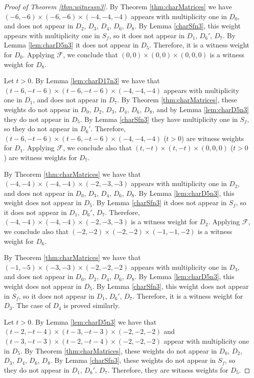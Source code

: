 \documentclass[11pt,reqno]{amsart}
\newcommand{\mc}[1]{\mathcal{#1}}
\numberwithin{equation}{section}
\begin{document}
\begin{proof}[Proof of Theorem \ref{thm:witnessn3}]
By Theorem \ref{thm:charMatrices} we have  $(-6,-6)\times (-6,-6)\times (-4,-4,-4)$ appears with multiplicity one in $D_0$, and does not appear in $D_2$, $D_3$, $D_4$, $D_6$, $D_8$. By Lemma \ref{charSfn3}, this weight appears with multiplicity one in $S_f$, so it does not appear in $D_1$, $D_6'$, $D_7$. By Lemma \ref{lem:charD5n3} it does not appear in $D_5$. Therefore, it is a witness weight for $D_0$. Applying $\mc{F}$, we conclude that $(0,0)\times (0,0)\times (0,0,0)$ is a witness weight for $D_8$.

Let $t>0$. By Lemma \ref{lem:charD17n3} we have that $(t-6,-t-6)\times (t-6,-t-6)\times (-4,-4,-4)$ appears with multiplicity one in $D_1$, and does not appear in $D_7$. By Theorem \ref{thm:charMatrices}, these weights do not appear in $D_0$, $D_2$, $D_3$, $D_4$, $D_6$, $D_8$, and by Lemma \ref{lem:charD5n3} they do not appear in $D_5$. By Lemma \ref{charSfn3} they have multiplicity one in $S_f$, so they do not appear in $D_6'$. Therefore, $(t-6,-t-6)\times (t-6,-t-6)\times (-4,-4,-4)$ ($t>0$) are witness weights for $D_1$. Applying $\mc{F}$, we conclude also that $(t,-t)\times (t,-t)\times (0,0,0)$ ($t>0$) are witness weights for $D_7$. 

By Theorem \ref{thm:charMatrices} we have that $(-4,-4)\times (-4,-4)\times (-2,-3,-3)$ appears with multiplicity one in $D_2$, and does not appear in $D_0$, $D_3$, $D_4$, $D_6$, $D_8$. By Lemma \ref{lem:charD5n3}, this weight does not appear in $D_5$. By Lemma \ref{charSfn3} it does not appear in $S_f$, so it does not appear in $D_1$, $D_6'$, $D_7$. Therefore, $(-4,-4)\times (-4,-4)\times (-2,-3,-3)$ is a witness weight for $D_2$. Applying $\mc{F}$, we conclude also that $(-2,-2)\times (-2,-2)\times (-1,-1,-2)$ is a witness weight for $D_6$.

By Theorem \ref{thm:charMatrices} we have that $(-1,-5)\times (-3,-3)\times (-2,-2,-2)$ appears with multiplicity one in $D_3$, and does not appear in $D_0$, $D_2$, $D_4$, $D_6$, $D_8$. By Lemma \ref{lem:charD5n3}, this weight does not appear in $D_5$. By Lemma \ref{charSfn3}, this weight does not appear in $S_f$, so it does not appear in $D_1$, $D_6'$, $D_7$. Therefore, it is a witness weight for $D_3$. The case of $D_4$ is proved similarly.

Let $t>0$. By Lemma \ref{lem:charD5n3} we have that $(t-2,-t-4)\times (t-3,-t-3)\times (-2,-2,-2)$ and $(t-3,-t-3)\times (t-2,-t-4)\times (-2,-2,-2)$ appear with multiplicity one in $D_5$. By Theorem \ref{thm:charMatrices}, these weights do not appear in $D_0$, $D_2$, $D_3$, $D_4$, $D_6$, $D_8$. By Lemma \ref{charSfn3}, these weights do not appear in $S_f$, so they do not appear in $D_1$, $D_6'$, $D_7$. Therefore, they are witness weights for $D_5$.


\end{proof}
\end{document}
